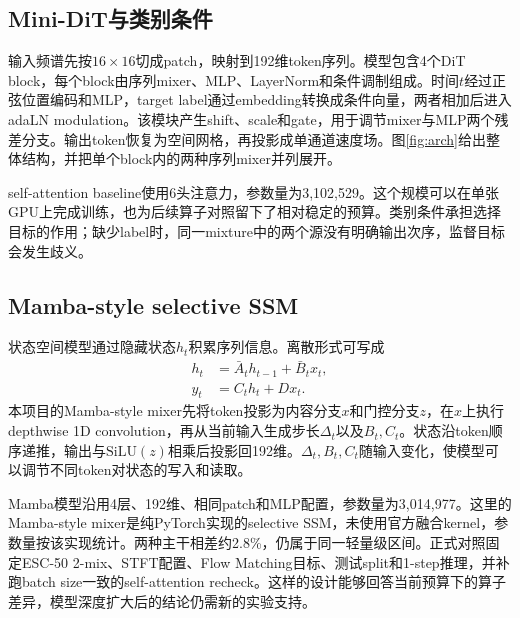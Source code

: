 \documentclass[UTF8,12pt,a4paper]{ctexart}
\begin{document}
\subsection{Mini-DiT与类别条件}

输入频谱先按$16\times16$切成patch，映射到192维token序列。模型包含4个DiT block，每个block由序列mixer、MLP、LayerNorm和条件调制组成。时间$t$经过正弦位置编码和MLP，target label通过embedding转换成条件向量，两者相加后进入adaLN modulation。该模块产生shift、scale和gate，用于调节mixer与MLP两个残差分支。输出token恢复为空间网格，再投影成单通道速度场。图\ref{fig:arch}给出整体结构，并把单个block内的两种序列mixer并列展开。

self-attention baseline使用6头注意力，参数量为3,102,529。这个规模可以在单张GPU上完成训练，也为后续算子对照留下了相对稳定的预算。类别条件承担选择目标的作用；缺少label时，同一mixture中的两个源没有明确输出次序，监督目标会发生歧义。

\subsection{Mamba-style selective SSM}

状态空间模型通过隐藏状态$h_t$积累序列信息。离散形式可写成
\begin{align}
  h_t &= \bar A_t h_{t-1}+\bar B_t x_t,\\
  y_t &= C_t h_t + D x_t.
\end{align}
本项目的Mamba-style mixer先将token投影为内容分支$x$和门控分支$z$，在$x$上执行depthwise 1D convolution，再从当前输入生成步长$\Delta_t$以及$B_t,C_t$。状态沿token顺序递推，输出与$\mathrm{SiLU}(z)$相乘后投影回192维。$\Delta_t,B_t,C_t$随输入变化，使模型可以调节不同token对状态的写入和读取。

Mamba模型沿用4层、192维、相同patch和MLP配置，参数量为3,014,977。这里的Mamba-style mixer是纯PyTorch实现的selective SSM，未使用官方融合kernel，参数量按该实现统计。两种主干相差约2.8\%，仍属于同一轻量级区间。正式对照固定ESC-50 2-mix、STFT配置、Flow Matching目标、测试split和1-step推理，并补跑batch size一致的self-attention recheck。这样的设计能够回答当前预算下的算子差异，模型深度扩大后的结论仍需新的实验支持。
\end{document}
